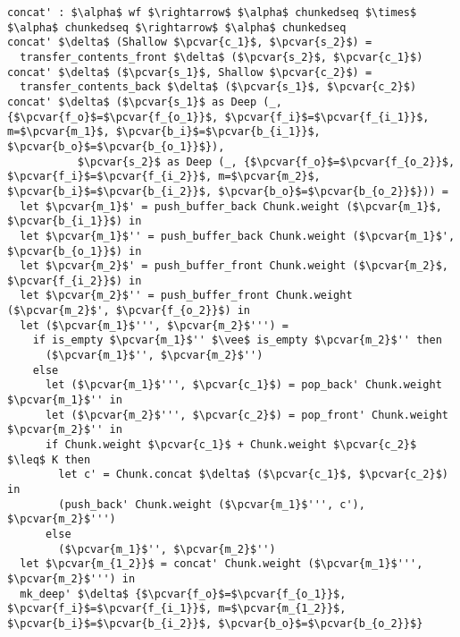 \documentclass[10pt]{article}
\newcommand{\pcvar}[1]{\mathtt{#1}}
\begin{document}
\begin{lstlisting}[language=pcpp,style=nonumbers]
concat' : $\alpha$ wf $\rightarrow$ $\alpha$ chunkedseq $\times$ $\alpha$ chunkedseq $\rightarrow$ $\alpha$ chunkedseq
concat' $\delta$ (Shallow $\pcvar{c_1}$, $\pcvar{s_2}$) =
  transfer_contents_front $\delta$ ($\pcvar{s_2}$, $\pcvar{c_1}$)
concat' $\delta$ ($\pcvar{s_1}$, Shallow $\pcvar{c_2}$) =
  transfer_contents_back $\delta$ ($\pcvar{s_1}$, $\pcvar{c_2}$)
concat' $\delta$ ($\pcvar{s_1}$ as Deep (_, {$\pcvar{f_o}$=$\pcvar{f_{o_1}}$, $\pcvar{f_i}$=$\pcvar{f_{i_1}}$, m=$\pcvar{m_1}$, $\pcvar{b_i}$=$\pcvar{b_{i_1}}$, $\pcvar{b_o}$=$\pcvar{b_{o_1}}$}),
           $\pcvar{s_2}$ as Deep (_, {$\pcvar{f_o}$=$\pcvar{f_{o_2}}$, $\pcvar{f_i}$=$\pcvar{f_{i_2}}$, m=$\pcvar{m_2}$, $\pcvar{b_i}$=$\pcvar{b_{i_2}}$, $\pcvar{b_o}$=$\pcvar{b_{o_2}}$})) =
  let $\pcvar{m_1}$' = push_buffer_back Chunk.weight ($\pcvar{m_1}$, $\pcvar{b_{i_1}}$) in
  let $\pcvar{m_1}$'' = push_buffer_back Chunk.weight ($\pcvar{m_1}$', $\pcvar{b_{o_1}}$) in
  let $\pcvar{m_2}$' = push_buffer_front Chunk.weight ($\pcvar{m_2}$, $\pcvar{f_{i_2}}$) in
  let $\pcvar{m_2}$'' = push_buffer_front Chunk.weight ($\pcvar{m_2}$', $\pcvar{f_{o_2}}$) in
  let ($\pcvar{m_1}$''', $\pcvar{m_2}$''') =
    if is_empty $\pcvar{m_1}$'' $\vee$ is_empty $\pcvar{m_2}$'' then
      ($\pcvar{m_1}$'', $\pcvar{m_2}$'')
    else
      let ($\pcvar{m_1}$''', $\pcvar{c_1}$) = pop_back' Chunk.weight $\pcvar{m_1}$'' in
      let ($\pcvar{m_2}$''', $\pcvar{c_2}$) = pop_front' Chunk.weight $\pcvar{m_2}$'' in
      if Chunk.weight $\pcvar{c_1}$ + Chunk.weight $\pcvar{c_2}$ $\leq$ K then
        let c' = Chunk.concat $\delta$ ($\pcvar{c_1}$, $\pcvar{c_2}$) in
        (push_back' Chunk.weight ($\pcvar{m_1}$''', c'), $\pcvar{m_2}$''')
      else
        ($\pcvar{m_1}$'', $\pcvar{m_2}$'')
  let $\pcvar{m_{1_2}}$ = concat' Chunk.weight ($\pcvar{m_1}$''', $\pcvar{m_2}$''') in
  mk_deep' $\delta$ {$\pcvar{f_o}$=$\pcvar{f_{o_1}}$, $\pcvar{f_i}$=$\pcvar{f_{i_1}}$, m=$\pcvar{m_{1_2}}$, $\pcvar{b_i}$=$\pcvar{b_{i_2}}$, $\pcvar{b_o}$=$\pcvar{b_{o_2}}$}
\end{lstlisting}
\end{document}
